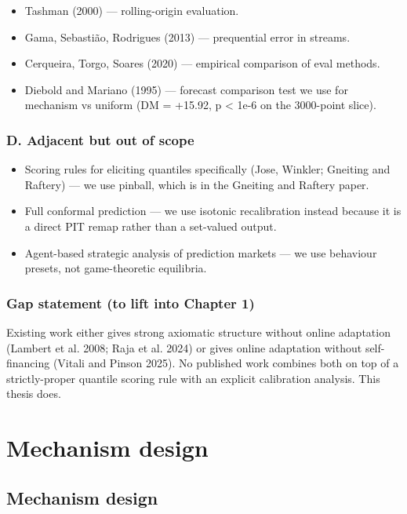 \documentclass[11pt,a4paper,openany]{report}
\begin{document}
\begin{itemize}
  \item Tashman (2000) — rolling-origin evaluation.
  \item Gama, Sebastião, Rodrigues (2013) — prequential error in streams.
  \item Cerqueira, Torgo, Soares (2020) — empirical comparison of eval methods.
  \item Diebold and Mariano (1995) — forecast comparison test we use for
    mechanism vs uniform (DM = +15.92, p < 1e-6 on the 3000-point slice).
\end{itemize}

\section{D. Adjacent but out of scope}

\begin{itemize}
  \item Scoring rules for eliciting quantiles specifically (Jose, Winkler;
    Gneiting and Raftery) — we use pinball, which is in the Gneiting and
    Raftery paper.
  \item Full conformal prediction — we use isotonic recalibration instead
    because it is a direct PIT remap rather than a set-valued output.
  \item Agent-based strategic analysis of prediction markets — we use
    behaviour presets, not game-theoretic equilibria.
\end{itemize}

\section{Gap statement (to lift into Chapter 1)}

Existing work either gives strong axiomatic structure without online
adaptation (Lambert et al. 2008; Raja et al. 2024) or gives online
adaptation without self-financing (Vitali and Pinson 2025). No published
work combines both on top of a strictly-proper quantile scoring rule
with an explicit calibration analysis. This thesis does.

\part*{Mechanism design}
\chapter{Mechanism design}
\end{document}

